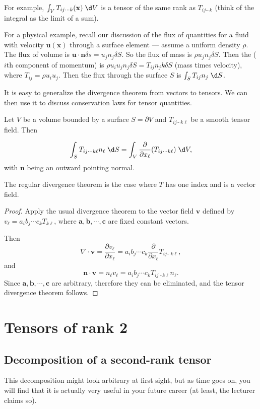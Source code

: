 \documentclass[a4paper]{article}
\begin{document}
For example, $\int_V T_{ij\cdots k}(\mathbf{x})\;\d V$ is a tensor of the same rank as $T_{ij\cdots k}$ (think of the integral as the limit of a sum).

For a physical example, recall our discussion of the flux of quantities for a fluid with velocity $\mathbf{u}(\mathbf{x})$ through a surface element --- assume a uniform density $\rho$. The flux of volume is $\mathbf{u}\cdot \mathbf{n}\delta s = u_j n_j \delta S$. So the flux of mass is $\rho u_j n_j \delta S$. Then the ($i$th component of momentum) is $\rho u_i u_j n_j \delta S = T_{ij}n_jk \delta S$ (mass times velocity), where $T_{ij} = \rho u_iu_j$. Then the flux through the surface $S$ is $\int_S T_{ij}n_j \;\d S$.

It is easy to generalize the divergence theorem from vectors to tensors. We can then use it to discuss conservation laws for tensor quantities.

Let $V$ be a volume bounded by a surface $S=\partial V$ and $T_{ij\cdots k\ell}$ be a smooth tensor field. Then

\begin{thm}
  \[
    \int_S T_{ij\cdots k\ell}n_\ell\;\d S = \int_V \frac{\partial}{\partial x_\ell}(T_{ij\cdots k\ell})\;\d V,
  \]
  with $\mathbf{n}$ being an outward pointing normal.
\end{thm}
The regular divergence theorem is the case where $T$ has one index and is a vector field.

\begin{proof}
  Apply the usual divergence theorem to the vector field $\mathbf{v}$ defined by $v_\ell = a_i b_j \cdots c_k T_{k\ell}$, where $\mathbf{a}, \mathbf{b}, \cdots, \mathbf{c}$ are fixed constant vectors.

  Then
  \[
    \nabla\cdot \mathbf{v} = \frac{\partial v_\ell}{\partial x_\ell} = a_i b_j \cdots c_k \frac{\partial}{\partial x_\ell}T_{ij\cdots k\ell},
  \]
  and
  \[
    \mathbf{n}\cdot \mathbf{v} = n_\ell v_\ell = a_i b_j \cdots c_k T_{ij\cdots k\ell }n_\ell.
  \]
  Since $\mathbf{a}, \mathbf{b}, \cdots, \mathbf{c}$ are arbitrary, therefore they can be eliminated, and the tensor divergence theorem follows.
\end{proof}
\section{Tensors of rank 2}
\subsection{Decomposition of a second-rank tensor}
This decomposition might look arbitrary at first sight, but as time goes on, you will find that it is actually very useful in your future career (at least, the lecturer claims so).
\end{document}
